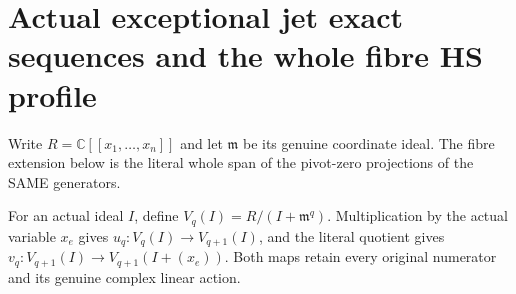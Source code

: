 \section{Actual exceptional jet exact sequences and the whole fibre HS profile}

Write $R=\mathbb C[[x_1,\ldots,x_n]]$ and let $\mathfrak m$ be its
genuine coordinate ideal. The fibre extension below is the literal
whole span of the pivot-zero projections of the SAME generators.

\begin{definition}
\label{hir:actual-exceptional-finite-jet-maps}
\leanok
For an actual ideal $I$, define $V_q(I)=R/(I+\mathfrak m^q)$.
Multiplication by the actual variable $x_e$ gives
$u_q:V_q(I)\to V_{q+1}(I)$, and the literal quotient gives
$v_q:V_{q+1}(I)\to V_{q+1}(I+(x_e))$.
Both maps retain every original numerator and its genuine complex
linear action.
\end{definition}

